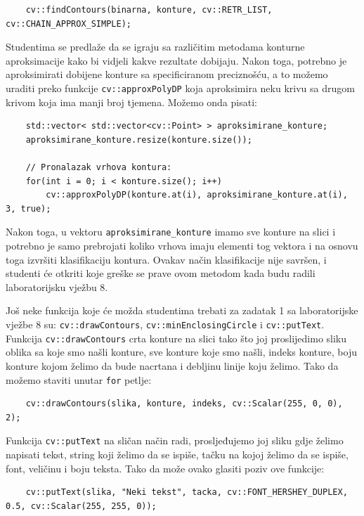 \documentclass[a4paper, 12pt]{article}
\begin{document}
\begin{lstlisting}
    cv::findContours(binarna, konture, cv::RETR_LIST, cv::CHAIN_APPROX_SIMPLE);
\end{lstlisting}

Studentima se predlaže da se igraju sa različitim metodama konturne aproksimacije kako bi vidjeli kakve rezultate dobijaju. Nakon toga, potrebno je aproksimirati dobijene konture sa specificiranom preciznošću, a to možemo uraditi preko funkcije \lstinline{cv::approxPolyDP} koja aproksimira neku krivu sa drugom krivom koja ima manji broj tjemena. Možemo onda pisati:

\begin{lstlisting}
    std::vector< std::vector<cv::Point> > aproksimirane_konture;
    aproksimirane_konture.resize(konture.size());

    // Pronalazak vrhova kontura:
    for(int i = 0; i < konture.size(); i++)
        cv::approxPolyDP(konture.at(i), aproksimirane_konture.at(i), 3, true);
\end{lstlisting}

Nakon toga, u vektoru \lstinline{aproksimirane_konture} imamo sve konture na slici i potrebno je samo prebrojati koliko vrhova imaju elementi tog vektora i na osnovu toga izvršiti klasifikaciju kontura. Ovakav način klasifikacije nije savršen, i studenti će otkriti koje greške se prave ovom metodom kada budu radili laboratorijsku vježbu 8.

Još neke funkcija koje će možda studentima trebati za zadatak 1 sa laboratorijske vježbe 8 su: \lstinline{cv::drawContours}, \lstinline{cv::minEnclosingCircle} i \lstinline{cv::putText}. Funkcija \lstinline{cv::drawContours} crta konture na slici tako što joj proslijedimo sliku oblika sa koje smo našli konture, sve konture koje smo našli, indeks konture, boju konture kojom želimo da bude nacrtana i debljinu linije koju želimo. Tako da možemo staviti unutar \lstinline{for} petlje:

\begin{lstlisting}
    cv::drawContours(slika, konture, indeks, cv::Scalar(255, 0, 0), 2);
\end{lstlisting}

Funkcija \lstinline{cv::putText} na sličan način radi, prosljeđujemo joj sliku gdje želimo napisati tekst, string koji želimo da se ispiše, tačku na kojoj želimo da se ispiše, font, veličinu i boju teksta. Tako da može ovako glasiti poziv ove funkcije:

\begin{lstlisting}
    cv::putText(slika, "Neki tekst", tacka, cv::FONT_HERSHEY_DUPLEX, 0.5, cv::Scalar(255, 255, 0));
\end{lstlisting}
\end{document}
